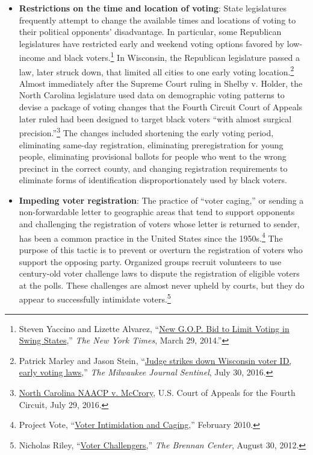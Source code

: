 \documentclass[12pt]{article}
\begin{document}
\begin{itemize}
\item \textbf{Restrictions on the time and location of voting}: State legislatures frequently attempt to change the available times and locations of voting to their political opponents' disadvantage. In particular, some Republican legislatures have restricted early and weekend voting options favored by low-income and black voters.\footnote{Steven Yaccino and Lizette Alvarez, ``\href{https://www.nytimes.com/2014/03/30/us/new-gop-bid-to-limit-voting-in-swing-states.html}{New G.O.P. Bid to Limit Voting in Swing States},'' \emph{The New York Times}, March 29, 2014.''} In Wisconsin, the Republican legislature passed a law, later struck down, that limited all cities to one early voting location.\footnote{Patrick Marley and Jason Stein, ``\href{https://www.jsonline.com/story/news/politics/2016/07/30/judge-strikes-down-wisconsin-voter-id-early-voting-laws/87803408/}{Judge strikes down Wisconsin voter ID, early voting laws},'' \emph{The Milwaukee Journal Sentinel}, July 30, 2016.} Almost immediately after the Supreme Court ruling in Shelby v. Holder, the North Carolina legislature used data on demographic voting patterns to devise a package of voting changes that the Fourth Circuit Court of Appeals later ruled had been designed to target black voters ``with almost surgical precision.''\footnote{\href{https://electionlawblog.org/wp-content/uploads/nc-4th.pdf}{North Carolina NAACP v. McCrory}, U.S. Court of Appeals for the Fourth Circuit, July 29, 2016.} The changes included shortening the early voting period, eliminating same-day registration, eliminating preregistration for young people, eliminating provisional ballots for people who went to the wrong precinct in the correct county, and changing registration requirements to eliminate forms of identification disproportionately used by black voters.

\item \textbf{Impeding voter registration}: The practice of ``voter caging,'' or sending a non-forwardable letter to geographic areas that tend to support opponents and challenging the registration of voters whose letter is returned to sender, has been a common practice in the United States since the 1950s.\footnote{Project Vote, ``\href{http://www.projectvote.org/wp-content/uploads/2010/02/2010-Legislative-Brief-Voter-Intimidation-and-Caging.pdf}{Voter Intimidation and Caging},'' February 2010.} The purpose of this tactic is to prevent or overturn the registration of voters who support the opposing party. Organized groups recruit volunteers to use century-old voter challenge laws to dispute the registration of eligible voters at the polls. These challenges are almost never upheld by courts, but they do appear to successfully intimidate voters.\footnote{Nicholas Riley, ``\href{http://www.brennancenter.org/sites/default/files/legacy/publications/Voter_Challengers.pdf}{Voter Challengers},'' \emph{The Brennan Center}, August 30, 2012.}


\end{itemize}
\end{document}
